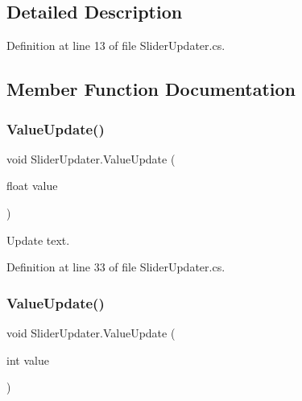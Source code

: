 \subsection{Detailed Description}


Definition at line 13 of file Slider\+Updater.\+cs.



\subsection{Member Function Documentation}
\mbox{\label{class_slider_updater_a33264abb23d46891dae8dc3855f51a9c}} 
\subsubsection{\texorpdfstring{Value\+Update()}{ValueUpdate()}\hspace{0.1cm}{\footnotesize\ttfamily [1/2]}}
{\footnotesize\ttfamily void Slider\+Updater.\+Value\+Update (\begin{DoxyParamCaption}\item[{float}]{value }\end{DoxyParamCaption})}



Update text. 



Definition at line 33 of file Slider\+Updater.\+cs.

\mbox{\label{class_slider_updater_a8c7e5769f8782fd3b68d23d79b183788}} 
\subsubsection{\texorpdfstring{Value\+Update()}{ValueUpdate()}\hspace{0.1cm}{\footnotesize\ttfamily [2/2]}}
{\footnotesize\ttfamily void Slider\+Updater.\+Value\+Update (\begin{DoxyParamCaption}\item[{int}]{value }\end{DoxyParamCaption})}



